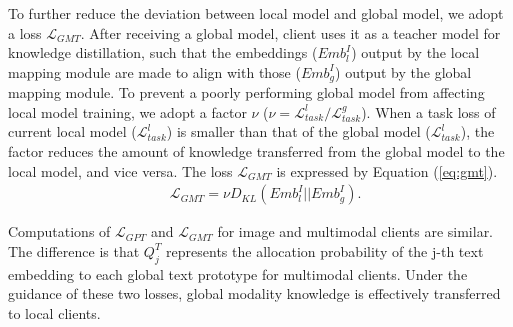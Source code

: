To further reduce the deviation between local model and global model, we adopt a loss $\mathcal L_{GMT}$.
After receiving a global model, client uses it as a teacher model for knowledge distillation, such that the embeddings ($Emb_l^I$) output by the local mapping module are made to align with those ($Emb_g^I$) output by the global mapping module. 
To prevent a poorly performing global model from affecting local model training, we adopt a factor $\nu$ ($\nu=\mathcal L_{task}^l/\mathcal L_{task}^g$).
When a task loss of current local model ($\mathcal L_{task}^l$) is smaller than that of the global model ($\mathcal L_{task}^l$), the factor reduces the amount of knowledge transferred from the global model to the local model, and vice versa. 
The loss $\mathcal L_{GMT}$ is expressed by Equation (\ref{eq:gmt}).
\begin{equation}
  \begin{aligned}\label{eq:gmt}
    &  \mathcal L_{GMT} = \nu D_{KL}(Emb_l^I||Emb_g^I).
  \end{aligned} 
\end{equation}

Computations of $\mathcal{L}_{GPT}$ and $\mathcal{L}_{GMT}$ for image and multimodal clients are similar. 
The difference is that $Q_j^T$ represents the allocation probability of the j-th text embedding to each global text prototype for multimodal clients. 
Under the guidance of these two losses, global modality knowledge is effectively transferred to local clients.


